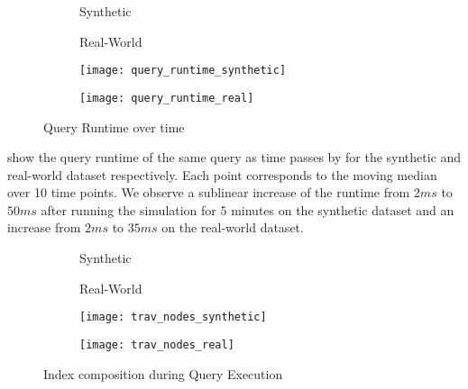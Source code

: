 \documentclass[abstracton,12pt]{scrartcl}
\theoremstyle{definition}
\begin{document}
\begin{figure}[h]
  \centering
  \begin{subfigure}{0.49\linewidth}
    \centering
    Synthetic
  \end{subfigure}
  \begin{subfigure}{0.49\linewidth}
    \centering
    Real-World
  \end{subfigure}
  \begin{subfigure}{0.49\linewidth}
    \centering
    \texttt{[image: query\_runtime\_synthetic]}
    \caption{}
    \label{fig:query_runtime_synthetic}
  \end{subfigure}
  \begin{subfigure}{0.49\linewidth}
    \centering
    \texttt{[image: query\_runtime\_real]}
    \caption{}
    \label{fig:query_runtime_real}
  \end{subfigure}
  \caption{Query Runtime over time}
  \label{fig:query_runtime}
\end{figure}

 show the 
query runtime of the same query as time passes by for the synthetic and
real-world dataset respectively. 
Each point corresponds to the moving median over 10 time points.
We observe a sublinear increase of the runtime from $2 ms$ to $50 ms$
after running the simulation for $5$ minutes
on the synthetic dataset and an increase from $2 ms$ to $35 ms$ on the
real-world dataset. 

\begin{figure}[h]
  \centering
  \begin{subfigure}{0.49\linewidth}
    \centering
    Synthetic
  \end{subfigure}
  \begin{subfigure}{0.49\linewidth}
    \centering
    Real-World
  \end{subfigure}
  \begin{subfigure}{0.49\linewidth}
    \centering
    \texttt{[image: trav\_nodes\_synthetic]}
    \caption{}
    \label{fig:trav_nodes_synthetic}
  \end{subfigure}
  \begin{subfigure}{0.49\linewidth}
    \centering
    \texttt{[image: trav\_nodes\_real]}
    \caption{}
    \label{fig:trav_nodes_real}
  \end{subfigure}
  \caption{Index composition during Query Execution}
  \label{fig:trav_nodes}
\end{figure}
\end{document}
